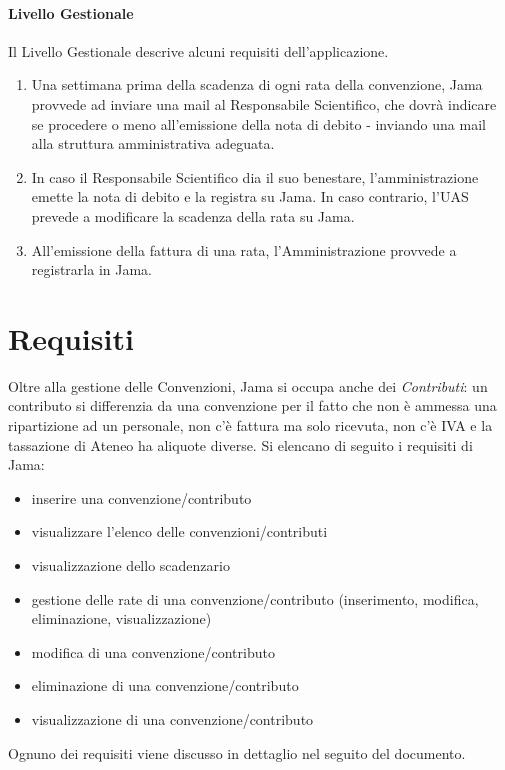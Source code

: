 \paragraph{Livello Gestionale}
Il Livello Gestionale descrive alcuni requisiti dell'applicazione.\newline
\begin{enumerate}
\item Una settimana prima della scadenza di ogni rata della convenzione, Jama provvede ad inviare una mail al Responsabile Scientifico, che dovrà indicare se procedere o meno all'emissione della nota di debito - inviando una mail alla struttura amministrativa adeguata.
\item In caso il Responsabile Scientifico dia il suo benestare, l'amministrazione emette la nota di debito e la registra su Jama. In caso contrario, l'UAS prevede a modificare la scadenza della rata su Jama.
\item All'emissione della fattura di una rata, l'Amministrazione provvede a registrarla in Jama.\newline
\end{enumerate}

\section{Requisiti}
Oltre alla gestione delle Convenzioni, Jama si occupa anche dei \textsl{Contributi}: un contributo si differenzia da una convenzione per il fatto che non è ammessa una ripartizione ad un personale, non c'è fattura ma solo ricevuta, non c'è IVA e la tassazione di Ateneo ha aliquote diverse.\newline
Si elencano di seguito i requisiti di Jama:

\begin{itemize}
\item inserire una convenzione/contributo
\item visualizzare l'elenco delle convenzioni/contributi
\item visualizzazione dello scadenzario
\item gestione delle rate di una convenzione/contributo (inserimento, modifica, eliminazione, visualizzazione)
\item modifica di una convenzione/contributo
\item eliminazione di una convenzione/contributo
\item visualizzazione di una convenzione/contributo\newline
\end{itemize}

Ognuno dei requisiti viene discusso in dettaglio nel seguito del documento.

